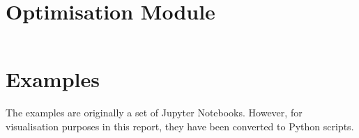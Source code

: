 \section{Optimisation Module}

\inputminted[fontsize=\footnotesize,linenos,breaklines=true,breakanywhere=true,frame=lines,baselinestretch=1]{python}{../optimisation/wandb_opt.py}

\section{Examples}

The examples are originally a set of Jupyter Notebooks. However, for visualisation purposes in this report, they have been converted to Python scripts. 

\inputminted[fontsize=\footnotesize,linenos,breaklines=true,breakanywhere=true,frame=lines,baselinestretch=1]{python}{../examples/findownloader.py}

\inputminted[fontsize=\footnotesize,linenos,breaklines=true,breakanywhere=true,frame=lines,baselinestretch=1]{python}{../examples/finpreprocessor.py}

\inputminted[fontsize=\footnotesize,linenos,breaklines=true,breakanywhere=true,frame=lines,baselinestretch=1]{python}{../examples/portfolio_optimisation.py}

\inputminted[fontsize=\footnotesize,linenos,breaklines=true,breakanywhere=true,frame=lines,baselinestretch=1]{python}{../examples/backtesting.py}

\inputminted[fontsize=\footnotesize,linenos,breaklines=true,breakanywhere=true,frame=lines,baselinestretch=1]{python}{../examples/hyperparameter_tuning.py}

\inputminted[fontsize=\footnotesize,linenos,breaklines=true,breakanywhere=true,frame=lines,baselinestretch=1]{python}{../examples/explainability.py}
